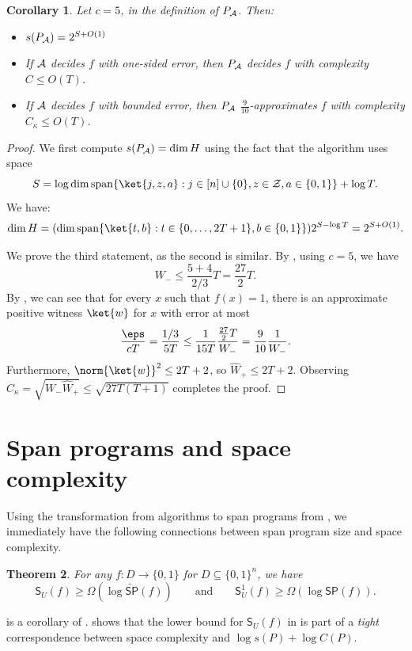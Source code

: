 \documentclass[11pt]{article}
\numberwithin{equation}{section}
\newtheorem{theorem}{Theorem}[section]
\newtheorem{corollary}[theorem]{Corollary}
\theoremstyle{definition}
\theoremstyle{plain}
\begin{document}
\begin{corollary}
Let $c=5$, in the definition of $P_{\cal A}$. Then:
\begin{itemize}
\item $s(P_{\cal A})=2^{S+O(1)}$
\item If $\cal A$ decides $f$ with one-sided error, then $P_{\cal A}$ decides $f$ with complexity $C\leq O(T)$.
\item If $\cal A$ decides $f$ with bounded error, then $P_{\cal A}$ $\frac{9}{10}$-approximates $f$ with complexity $C_\kappa\leq O(T)$.
\end{itemize}
\end{corollary}
\begin{proof}
We first compute $s(P_{\cal A})=\dim H$ using the fact that the algorithm uses space 
$$S=\log\dim\mathrm{span}\{\ket{j,z,a}:j\in [n]\cup\{0\},z\in{\cal Z},a\in\{0,1\}\}+\log T.$$
We have:
\begin{align*}
\dim H = (\dim\mathrm{span}\{\ket{t,b}:t\in\{0,\dots,2T+1\},b\in\{0,1\}\})2^{S-\log T}
 = 2^{S+O(1)}.
\end{align*}

We prove the third statement, as the second is similar. By , using $c=5$, we have 
$$W_-\leq \frac{5+4}{2/3}T = \frac{27}{2}T.$$
By , we can see that for every $x$ such that $f(x)=1$, there is an approximate positive witness $\ket{w}$ for $x$ with error 
at most %
$$\frac{\eps}{cT} = \frac{1/3}{5T}\leq \frac{1}{15T}\frac{\frac{27}{2}T}{W_-}=\frac{9}{10}\frac{1}{W_-}.$$
Furthermore, $\norm{\ket{w}}^2\leq 2T+2$, so $\widehat{W}_+\leq 2T+2$.
Observing
$C_{\kappa} = \sqrt{W_-\widehat{W}_+}\leq \sqrt{27T(T+1)}$ completes the proof.
\end{proof}

\section{Span programs and space complexity}\label{sec:span-space}

Using the transformation from  
algorithms to span programs from , we immediately have the following connections between span program size and space complexity.


\begin{theorem}\label{thm:span-space-lower-bound}
For any $f:D\rightarrow \{0,1\}$ for $D\subseteq \{0,1\}^n$, we have 
\begin{equation*}
\mathsf{S}_U(f)\geq \Omega\left(\log \widetilde{\mathsf{SP}}(f)\right) \qquad\mbox{and}\qquad \mathsf{S}_U^1(f)\geq \Omega\left(\log \mathsf{SP}(f)\right).
\end{equation*}
\end{theorem}
\noindent {} is a corollary of . 
 shows that the lower bound for $\mathsf{S}_U(f)$ in  is part of a \emph{tight} correspondence between space complexity and $\log s(P)+\log C(P)$. 
\end{document}
